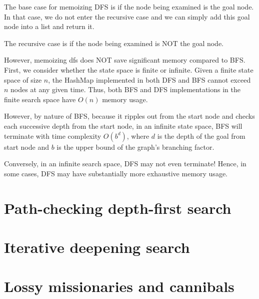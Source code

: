\documentclass[a4paper]{report}
\begin{document}
The base case for memoizing DFS is if the node being examined is the goal node. In that case, we do not enter the recursive case and we can simply add this goal node into a list
and return it.

The recursive case is if the node being examined is NOT the goal node. 

However, memoizing dfs does NOT save significant memory compared to BFS. First, we consider whether the state space is finite or infinite. 
Given a finite state space of size $n$, the HashMap implemented in both DFS and BFS cannot exceed $n$ nodes at any given time. Thus,
both BFS and DFS implementations in the finite search space have $O(n)$ memory usage. 

However, by nature of BFS, because it ripples out from the
start node and checks each successive depth from the start node, in an infinite state space, BFS will terminate with time complexity $O(b^d)$, 
where $d$ is the depth of the goal from start node and $b$ is the upper bound of the graph's branching factor. 

Conversely, in an infinite search space, DFS may not even terminate! Hence, in some cases, DFS may have substantially more exhaustive
memory usage. 


\section{Path-checking depth-first search}

\section{Iterative deepening search}



\section{Lossy missionaries and cannibals}
\end{document}
